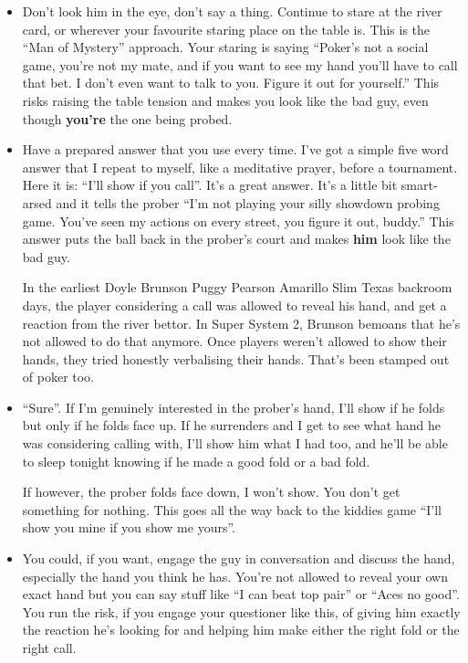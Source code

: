 \begin{itemize}
  \item Don't look him in the eye, don't say a thing. Continue to
    stare at the river card, or wherever your favourite staring place
    on the table is. This is the ``Man of Mystery'' approach. Your
    staring is saying ``Poker's not a social game, you're not my
    mate, and if you want to see my hand you'll have to call that
    bet. I don't even want to talk to you. Figure it out for
    yourself.'' This risks raising the table tension and makes you
    look like the bad guy, even though \textbf{you're} the one being
    probed.

  \item Have a prepared answer that you use every time. I've got a
    simple five word answer that I repeat to myself, like a meditative
    prayer, before a tournament. Here it is: ``I'll show if you
    call''. It's a great answer. It's a little bit smart-arsed and it
    tells the prober ``I'm not playing your silly showdown probing
    game. You've seen my actions on every street, you figure it out,
    buddy.'' This answer puts the ball back in the prober's court and
    makes \textbf{him} look like the bad guy.

  In the earliest Doyle Brunson Puggy Pearson Amarillo Slim Texas
  backroom days, the player considering a call was allowed to reveal
  his hand, and get a reaction from the river bettor. In Super System
  2, Brunson bemoans that he's not allowed to do that anymore.
  Once players weren't allowed to show their hands, they tried
  honestly verbalising their hands. That's been stamped out of poker
  too.

  \item ``Sure''. If I'm genuinely interested in the prober's hand,
    I'll show if he folds but only if he folds face up. If he
    surrenders and I get to see what hand he was considering calling
    with, I'll show him what I had too, and he'll be able to sleep
    tonight knowing if he made a good fold or a bad fold.

    If however, the prober folds face down, I won't show. You don't
    get something for nothing. This goes all the way back to the
    kiddies game ``I'll show you mine if you show me yours''.

  \item You could, if you want, engage the guy in conversation and
    discuss the hand, especially the hand you think he has. You're not
    allowed to reveal your own exact hand but you can say stuff like
    ``I can beat top pair'' or ``Aces no good''. You run the risk, if
    you engage your questioner like this, of giving him exactly the
    reaction he's looking for and helping him make either the right
    fold or the right call.


\end{itemize}
